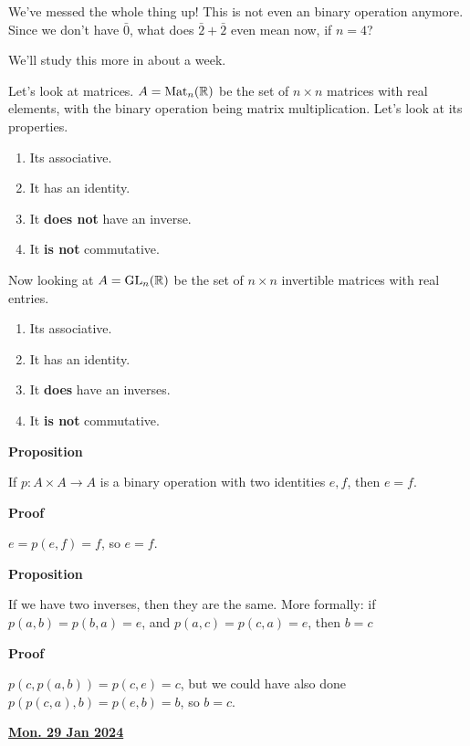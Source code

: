 \documentclass[12pt]{article}
\renewcommand{\date}[1]{\underline{\bf #1}}
\def\mat{\text{Mat}}
\def\gl{\text{GL}}
\begin{document}
{
	We've messed the whole thing up! This is not even an binary operation
	anymore. Since we don't have $\bar 0$, what does $\bar 2 + \bar 2$ even mean
	now, if $n = 4$?

	We'll study this more in about a week.
}

Let's look at matrices. $A = \mat_n(\R)$ be the set of $n \times n$ matrices
with real elements, with the binary operation being matrix multiplication.
Let's look at its properties.

\begin{enumerate}
	\item Its associative.
	\item It has an identity.
	\item It {\bf does not} have an inverse.
	\item It {\bf is not} commutative.
\end{enumerate}

Now looking at $A = \gl_n(\R)$ be the set of $n \times n$ invertible matrices
with real entries.

\begin{enumerate}
	\item Its associative.
	\item It has an identity.
	\item It {\bf does} have an inverses.
	\item It {\bf is not} commutative.
\end{enumerate}

{\bf Proposition}

If $p: A \times A \to A$ is a binary operation with two identities $e, f$,
then $e = f$.

	{\bf Proof}

$e = p(e, f) = f$, so $e = f$.


	{\bf Proposition}

If we have two inverses, then they are the same. More formally: if $p(a, b) =
	p(b, a)= e$, and $p(a, c) = p(c, a) = e$, then $b = c$

{\bf Proof}

$p(c, p(a, b)) = p(c, e) = c$, but we could have also done $p(p(c, a), b) =
	p(e, b) = b$, so $b = c$.

\date{Mon. 29 Jan 2024}

\end{document}
